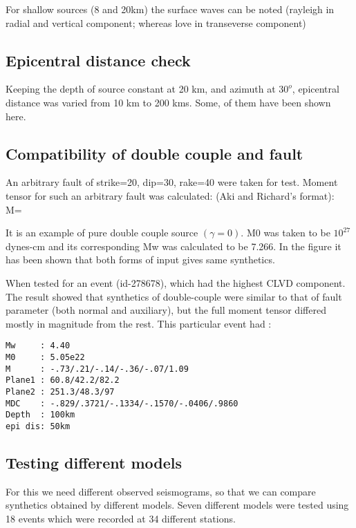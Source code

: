 \documentclass[11pt,titlepage,fleqn]{article}
\begin{document}
For shallow sources (8 and 20km) the surface waves can be noted (rayleigh in radial and vertical component; whereas love in transeverse component)

\subsection{Epicentral distance check}
Keeping the depth of source constant at 20 km, and azimuth at $30^o$, epicentral distance was varied from 10 km to 200 kms. Some, of them have been shown here.

\subsection{Compatibility of double couple and fault}
An arbitrary fault of strike=20, dip=30, rake=40 were taken for test. Moment tensor for such an arbitrary fault was calculated:
(Aki and Richard's format):
\eq
M= 
\en

It is an example of pure double couple source $(\gamma=0)$. M0 was taken to be $10^{27}$ dynes-cm and its corresponding Mw was calculated to be 7.266. 
In the figure it has been shown that both forms of input gives same synthetics.

When tested for an event (id-278678), which had the highest CLVD component. The result showed that synthetics of double-couple were similar to that of fault parameter (both normal and auxiliary), but the full moment tensor differed mostly in magnitude from the rest. This particular event had :
\begin{verbatim}
Mw     : 4.40
M0     : 5.05e22
M      : -.73/.21/-.14/-.36/-.07/1.09
Plane1 : 60.8/42.2/82.2
Plane2 : 251.3/48.3/97
MDC    : -.829/.3721/-.1334/-.1570/-.0406/.9860
Depth  : 100km
epi dis: 50km
\end{verbatim}


\subsection{Testing different models}
For this we need different observed seismograms, so that we can compare synthetics obtained by different models. Seven different models were tested using 18 events which were recorded at 34 different stations.
\end{document}
